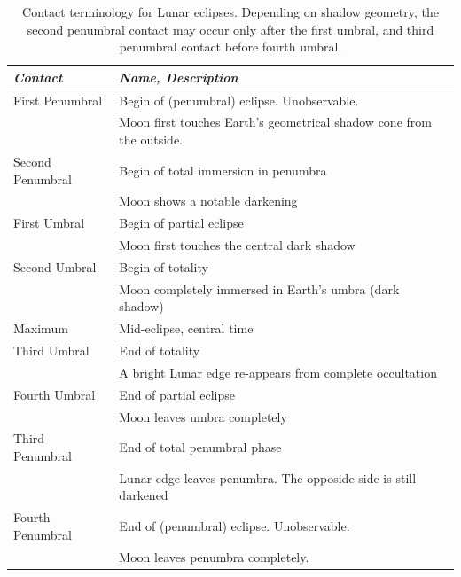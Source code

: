 \begin{table}[p]
  \centering\small
  \begin{tabular}{ll}
\toprule
\emph{Contact} & \emph{Name, Description}\\\midrule
First  Penumbral & Begin of (penumbral) eclipse. Unobservable. \\
                 & Moon first touches Earth's geometrical shadow cone from the outside. \\  
Second Penumbral & Begin of total immersion in penumbra\\
                 & Moon shows a notable darkening \\  
First  Umbral    & Begin of partial eclipse\\
                 & Moon first touches the central dark shadow \\  
Second Umbral    & Begin of totality\\
                 & Moon completely immersed in Earth's umbra (dark shadow) \\  
Maximum          & Mid-eclipse, central time\\
Third  Umbral    & End of totality\\
                 & A bright Lunar edge re-appears from complete occultation \\  
Fourth Umbral    & End of partial eclipse\\
                 & Moon leaves umbra completely \\  
Third  Penumbral & End of total penumbral phase\\
                 & Lunar edge leaves penumbra. The opposide side is still darkened\\  
Fourth Penumbral & End of (penumbral) eclipse. Unobservable. \\
                 & Moon leaves penumbra completely. \\  
\bottomrule
\end{tabular}
\caption{Contact terminology for Lunar eclipses. Depending on shadow
  geometry, the second penumbral contact may occur only after the first
  umbral, and third penumbral contact before fourth umbral.}
\label{tab:Eclipses:ContactTimesLunar}
\end{table}


